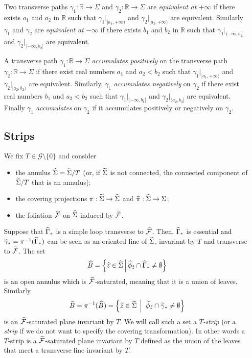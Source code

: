 \documentclass[10pt,a4paper]{article}
\theoremstyle{definition}
\theoremstyle{plain}
\numberwithin{equation}{section}
\numberwithin{figure}{section}
\newcommand{\R}{\mathbb{R}}
\newcommand{\G}{\mathcal{G}}
\newcommand{\F}{\mathcal{F}}
\let\oldtilde\tilde
\renewcommand*{\tilde}[1]{\mathchoice{\widetilde{#1}}{\widetilde{#1}}{\oldtilde{#1}}{\oldtilde{#1}}}
\let\oldhat\hat
\renewcommand*{\hat}[1]{\mathchoice{\widehat{#1}}{\widehat{#1}}{\oldhat{#1}}{\oldhat{#1}}}
\begin{document}
Two transverse paths $\gamma_1:\R\to \Sigma$ and $\gamma_2:\R\to \Sigma$ are \emph{equivalent at $+\infty$} if there exists $a_1$ and $a_2$ in $\R$ such that $\gamma_1{}|_{[a_1,+\infty)}$ and $\gamma_2{}|_{[a_2,+\infty)}$ are equivalent. Similarly $\gamma_1$ and $\gamma_2$ are \emph{equivalent at $-\infty$} if there exists $b_1$ and $b_2$ in $\R$ such that $\gamma_1{}|_{(-\infty,b_1]}$ and $\gamma_2{}|_{(-\infty,b_2]}$ are equivalent.


A transverse path $\gamma_1:\R\to \Sigma$ \emph{accumulates positively} on the transverse path $\gamma_2:\R\to \Sigma$ if there exist real numbers $a_1$ and $a_2<b_2$ such that $\gamma_1{}|_{[a_1,+\infty)}$ and $\gamma_2{}|_{[a_2,b_2)}$ are equivalent. Similarly, $\gamma_1$ \emph{accumulates negatively} on $\gamma_2$ if there exist real numbers $b_1$ and $a_2<b_2$ such that $\gamma_1{}|_{(-\infty,b_1]}$ and $\gamma_2{}|_{(a_2,b_2]}$ are equivalent. Finally $\gamma_1$ \emph{accumulates} on $\gamma_2$ if it accumulates positively or negatively on $\gamma_2$.


\subsection{Strips} \label{ss:strips}

We fix $T\in {\G}\setminus\{0\}$ and consider
\begin{itemize}
\item the annulus $\hat\Sigma=\tilde\Sigma/T$ (or, if $\tilde\Sigma$ is not connected, the connected component of $\tilde\Sigma/T$ that is an annulus);
\item the covering projections $\pi: \tilde\Sigma\to \hat\Sigma$ and $\hat\pi: \hat\Sigma\to \Sigma$;
\item the foliation $\hat{\F}$ on $\hat{\Sigma}$ induced by $\tilde{\F}$.
\end{itemize}
Suppose that $\hat\Gamma_*$ is a simple loop transverse to $\hat{\F}$. Then, $\hat\Gamma_*$ is essential and $\tilde\gamma_*=\pi^{-1}(\hat\Gamma_*)$ can be seen as an oriented line of $\tilde \Sigma$, invariant by $T$ and transverse to $\tilde{\F}$. The set
\[
\hat B=\left\{\hat z \in \hat\Sigma \,\middle| \,\hat \phi_{\hat z} \cap \hat\Gamma_*\not=\emptyset\right\}
\]
is an open annulus which is $\hat{\F}$-saturated, meaning that it is a union of leaves. Similarly
\[
\tilde B=\pi^{-1}(\hat B)=\left\{\tilde z \in \tilde\Sigma\,\,\middle| \,\enskip \tilde\phi_{\tilde z} \cap \tilde\gamma_*\not=\emptyset\right\}
\]
is an $\tilde{\F}$-saturated plane invariant by $T$. We will call such a set a \emph{$T$-strip} (or a \emph{strip} if we do not want to specify the covering transformation). In other words a $T$-strip is a $\tilde{\F}$-saturated plane invariant by $T$ defined as the union of the leaves that meet a transverse line invariant by $T$.
\end{document}
